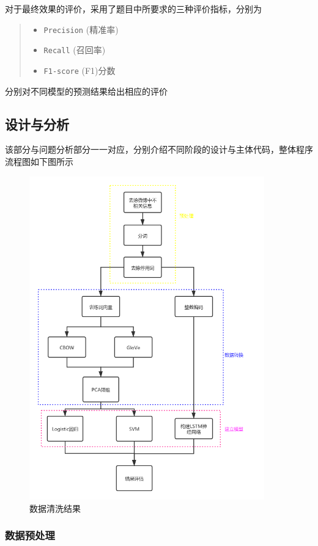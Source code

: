 \documentclass[UTF8]{ctexart}
\begin{document}
对于最终效果的评价，采用了题目中所要求的三种评价指标，分别为
\begin{quote}
    \begin{itemize}
        \item \lstinline{Precision} (精准率)
        \item \lstinline{Recall} (召回率)
        \item \lstinline{F1-score} (F1)分数
    \end{itemize}
\end{quote}

分别对不同模型的预测结果给出相应的评价
\newpage
\subsection{设计与分析}
该部分与问题分析部分一一对应，分别介绍不同阶段的设计与主体代码，整体程序流程图如下图所示

\begin{figure}[htb]
    \centering
    \includegraphics[width=4in]{asset/流程图.png}
    \caption{数据清洗结果} %
\end{figure}

\newpage
\subsubsection{数据预处理}
\end{document}
